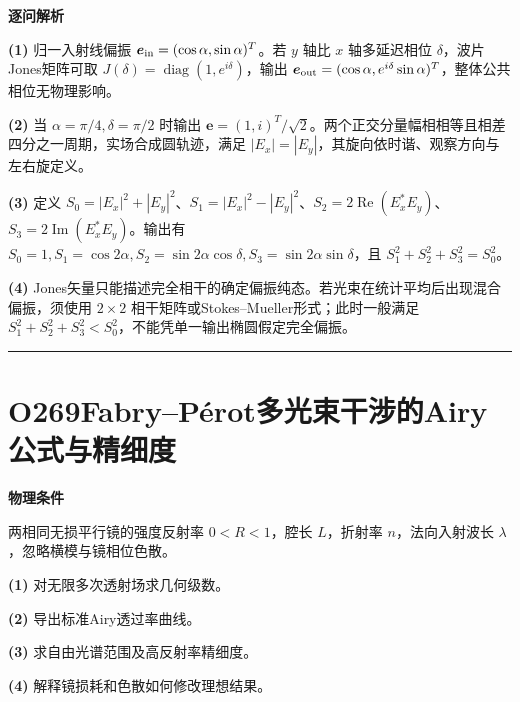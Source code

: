 \documentclass[UTF8,a4paper,11pt,oneside,openany]{ctexbook}
\begin{document}
\par\medskip\noindent\textbf{逐问解析}
\par\noindent\textbf{(1)} 归一入射线偏振 \(\boldsymbol e_{\rm in}=(\cos\alpha,\sin\alpha)^T\)。若 \(y\) 轴比 \(x\) 轴多延迟相位 \(\delta\)，波片 Jones矩阵可取 \(J(\delta)=\operatorname{diag}(1,e^{i\delta})\)，输出 \(\boldsymbol e_{\rm out}=(\cos\alpha,e^{i\delta}\sin\alpha)^T\)，整体公共相位无物理影响。
\par\noindent\textbf{(2)} 当 \(\alpha=\pi/4,\delta=\pi/2\) 时输出 \(\boldsymbol e=(1,i)^T/\sqrt2\)。两个正交分量幅相相等且相差四分之一周期，实场合成圆轨迹，满足 \(|E_x|=|E_y|\)，其旋向依时谐、观察方向与左右旋定义。
\par\noindent\textbf{(3)} 定义 \(S_0=|E_x|^2+|E_y|^2\)、\(S_1=|E_x|^2-|E_y|^2\)、\(S_2=2\operatorname{Re}(E_x^*E_y)\)、\(S_3=2\operatorname{Im}(E_x^*E_y)\)。输出有 \(S_0=1,S_1=\cos2\alpha,S_2=\sin2\alpha\cos\delta,S_3=\sin2\alpha\sin\delta\)，且 \(S_1^2+S_2^2+S_3^2=S_0^2\)。
\par\noindent\textbf{(4)} Jones矢量只能描述完全相干的确定偏振纯态。若光束在统计平均后出现混合偏振，须使用 \(2\times2\) 相干矩阵或Stokes–Mueller形式；此时一般满足 \(S_1^2+S_2^2+S_3^2<S_0^2\)，不能凭单一输出椭圆假定完全偏振。

\par\bigskip\hrule\bigskip
\section*{O269\quad Fabry–Pérot多光束干涉的Airy公式与精细度}
\textbf{物理条件}\par 两相同无损平行镜的强度反射率 \(0<R<1\)，腔长 \(L\)，折射率 \(n\)，法向入射波长 \(\lambda\)，忽略横模与镜相位色散。
\par\noindent\textbf{(1)} 对无限多次透射场求几何级数。
\par\noindent\textbf{(2)} 导出标准Airy透过率曲线。
\par\noindent\textbf{(3)} 求自由光谱范围及高反射率精细度。
\par\noindent\textbf{(4)} 解释镜损耗和色散如何修改理想结果。
\end{document}
